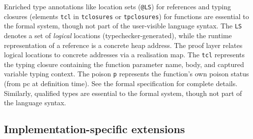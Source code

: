 \documentclass[12pt]{article}
\begin{document}
Enriched type annotations like location sets (\texttt{@LS}) for references and
typing closures (elements \texttt{tcl} in \texttt{tclosures} or \texttt{tpclosures}) for functions are essential to the
formal system, though not part of the user-visible language syntax. The
\texttt{LS} denotes a set of \emph{logical} locations (typechecker-generated),
while the runtime representation of a reference is a concrete heap address.
The proof layer relates logical locations to concrete addresses via a
realisation map. The \texttt{tcl} represents the typing closure containing the
function parameter name, body, and captured variable typing context. The poison
\texttt{p} represents the function's own poison status (from pc at definition
time). See the formal specification for complete details. Similarly, qualified
types are essential to the formal system, though not part of the language
syntax.

\subsection{Implementation-specific extensions}
\end{document}
